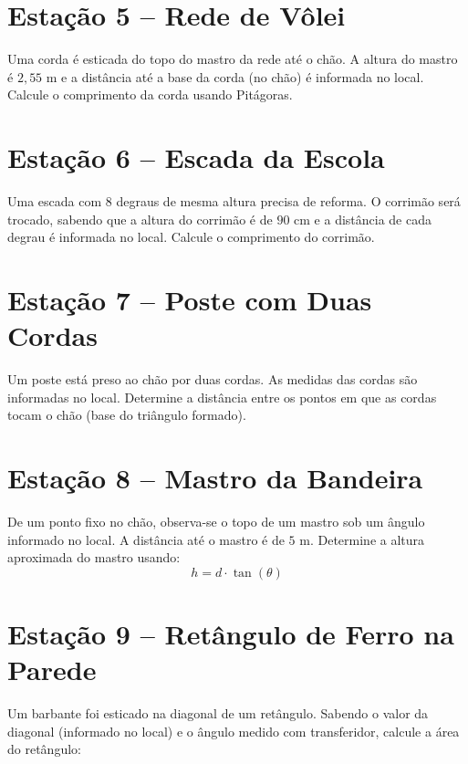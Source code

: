 \documentclass[a4paper,12pt]{article}
\begin{document}
\begin{multicols}{2}
		\section*{Estação 5 – Rede de Vôlei}
		Uma corda é esticada do topo do mastro da rede até o chão.  
		A altura do mastro é $2,55$ m e a distância até a base da corda (no chão) é informada no local.  
		Calcule o comprimento da corda usando Pitágoras.
		
		\vspace{0.5cm}
		
		\section*{Estação 6 – Escada da Escola}
		Uma escada com 8 degraus de mesma altura precisa de reforma.  
		O corrimão será trocado, sabendo que a altura do corrimão é de $90$ cm e a distância de cada degrau é informada no local.  
		Calcule o comprimento do corrimão.
		
		\vspace{0.5cm}
		
		\section*{Estação 7 – Poste com Duas Cordas}
		Um poste está preso ao chão por duas cordas.  
		As medidas das cordas são informadas no local.  
		Determine a distância entre os pontos em que as cordas tocam o chão (base do triângulo formado).
		
		\vspace{0.5cm}
		
		\section*{Estação 8 – Mastro da Bandeira}
		De um ponto fixo no chão, observa-se o topo de um mastro sob um ângulo informado no local.  
		A distância até o mastro é de $5$ m.  
		Determine a altura aproximada do mastro usando:
		\[
		h = d \cdot \tan(\theta)
		\]
		
		\vspace{0.5cm}
		
		\section*{Estação 9 – Retângulo de Ferro na Parede}
		Um barbante foi esticado na diagonal de um retângulo.  
		Sabendo o valor da diagonal (informado no local) e o ângulo medido com transferidor, calcule a área do retângulo:  
	
	\end{multicols}
	
\end{document}
